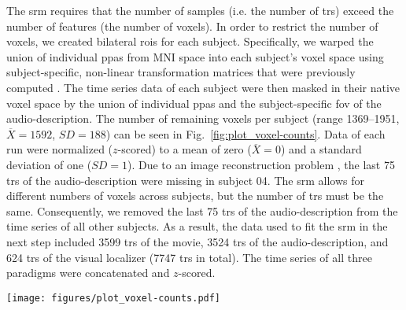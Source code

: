 The \ac{srm} requires that the number of samples (i.e. the number of \acp{tr})
exceed the number of features (the number of voxels).
%
In order to restrict the number of voxels, we created bilateral \acp{roi} for
each subject.
%
Specifically, we warped the union of individual \acp{ppa} \citep[s. Fig. 1
in][]{haeusler2022processing} from MNI space into each subject's voxel space
using subject-specific, non-linear transformation matrices that were previously
computed
\citep[][\href{https://github.com/psychoinformatics-de/studyforrest-data-templatetransforms
}{\url{github.com/psychoinformatics-de/studyforrest-data-templatetransforms}}]{hanke2014audiomovie}.
The time series data of each subject were then masked in their native voxel
space by the union of individual \acp{ppa} and the subject-specific \ac{fov} of
the audio-description.
The number of remaining voxels per subject (range 1369--1951,
$\overline{X}=1592$, $SD=188$) can be seen in Fig.~\ref{fig:plot_voxel-counts}.
Data of each run were normalized ($z$-scored) to a mean of zero
($\overline{X}=0$) and a standard deviation of one ($SD=1$).
%
Due to an image reconstruction problem \citep[cf.][]{hanke2014audiomovie}, the
last 75 \acp{tr} of the audio-description were missing in subject 04.
%
The \ac{srm} allows for different numbers of voxels across subjects, but the
number of \acp{tr} must be the same.
%
Consequently, we removed the last 75 \acp{tr} of the audio-description from the
time series of all other subjects.
As a result, the data used to fit the \ac{srm} in the next step included 3599
\acp{tr} of the movie, 3524 \acp{tr} of the audio-description, and 624 \acp{tr}
of the visual localizer (7747 \acp{tr} in total).
The time series of all three paradigms were concatenated and $z$-scored.

\begin{figure*}[tbp]
\centering
\texttt{[image: figures/plot\_voxel-counts.pdf]}
\caption{
%
\textbf{Number of voxels in the bilateral regions of interest (ROIs)
of each subject.}
%
In order to reduce the number of voxels, we warped the union of
individual \acp{ppa} \citep[cf. Fig. 1 in][]{haeusler2022processing} from
MNI space into each subject's native voxel space.
%
The remaining voxels of each subject were further constrained to those
voxels that are included in the respective subject's \ac{fov} of the
audio-description \citep[cf.][]{hanke2014audiomovie}.
}
\label{fig:plot_voxel-counts}
\end{figure*}


